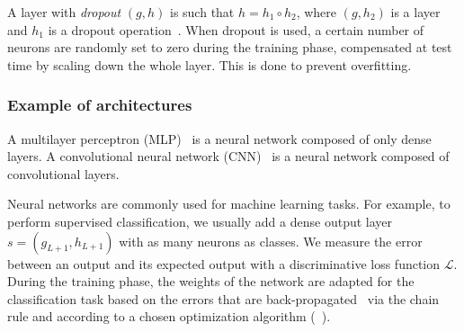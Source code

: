 A layer with \textit{dropout} $(g,h)$ is such that $h = h_1 \circ h_2$, where $(g,h_2)$ is a layer and $h_1$ is a dropout operation~\citep{srivastava2014dropout}. When dropout is used, a certain number of neurons are randomly set to zero during the training phase, compensated at test time by scaling down the whole layer. This is done to prevent overfitting.

\subsubsection{Example of architectures}


A multilayer perceptron (MLP)~\citep{hornik1989multilayer} is a neural network composed of only dense layers.
A convolutional neural network (CNN)~\citep{lecun1998gradient} is a neural network composed of convolutional layers.

Neural networks are commonly used for machine learning tasks. For example, to perform supervised classification, we usually add a dense output layer $s=(g_{L+1},h_{L+1})$ with as many neurons as classes. We measure the error between an output and its expected output with a discriminative loss function $\mathcal{L}$. During the training phase, the weights of the network are adapted for the classification task based on the errors that are back-propagated~\citep{hornik1989multilayer} via the chain rule and according to a chosen optimization algorithm (\eg~\cite{bottou2010large}).
